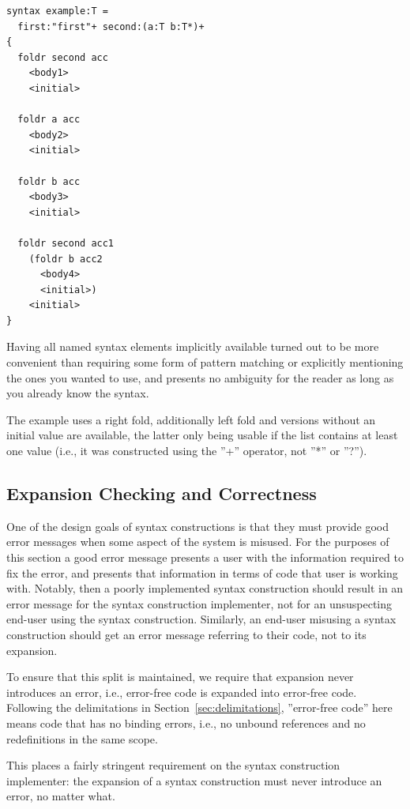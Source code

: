 \documentclass{kththesis}
\begin{document}
\begin{verbatim}
syntax example:T =
  first:"first"+ second:(a:T b:T*)+
{
  foldr second acc
    <body1>
    <initial>

  foldr a acc
    <body2>
    <initial>

  foldr b acc
    <body3>
    <initial>

  foldr second acc1
    (foldr b acc2
      <body4>
      <initial>)
    <initial>
}
\end{verbatim}

Having all named syntax elements implicitly available turned out to be more convenient than requiring some form of pattern matching or explicitly mentioning the ones you wanted to use, and presents no ambiguity for the reader as long as you already know the syntax.

The example uses a right fold, additionally left fold and versions without an initial value are available, the latter only being usable if the list contains at least one value (i.e., it was constructed using the ''+'' operator, not ''*'' or ''?'').

\subsection{Expansion Checking and Correctness} \label{sec:expansion-checking}

One of the design goals of syntax constructions is that they must provide good error messages when some aspect of the system is misused. For the purposes of this section a good error message presents a user with the information required to fix the error, and presents that information in terms of code that user is working with. Notably, then a poorly implemented syntax construction should result in an error message for the syntax construction implementer, not for an unsuspecting end-user using the syntax construction. Similarly, an end-user misusing a syntax construction should get an error message referring to their code, not to its expansion.

To ensure that this split is maintained, we require that expansion never introduces an error, i.e., error-free code is expanded into error-free code. Following the delimitations in Section~\ref{sec:delimitations}, ''error-free code'' here means code that has no binding errors, i.e., no unbound references and no redefinitions in the same scope.

This places a fairly stringent requirement on the syntax construction implementer: the expansion of a syntax construction must never introduce an error, no matter what.
\end{document}
